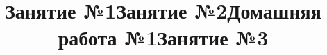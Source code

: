 \title{Занятие №1}
\begin{listofex}
	\item {}
	\item {}
	\item {}
	\item {}
	\item {}
	\item {}
	\item {}
	\item {}
\end{listofex}
\newpage
\title{Занятие №2}
\begin{listofex}
	\item {}
	\item {}
	\item {}
	\item {}
	\item {}
	\item {}
	\item {}
	\item {}
	\item {}
\end{listofex}
\newpage
\title{Домашняя работа №1}
\begin{listofex}
	\item {}
	\item {}
	\item {}
	\item {}
	\item {}
	\item {}
	\item {}
\end{listofex}
\newpage
\title{Занятие №3}
